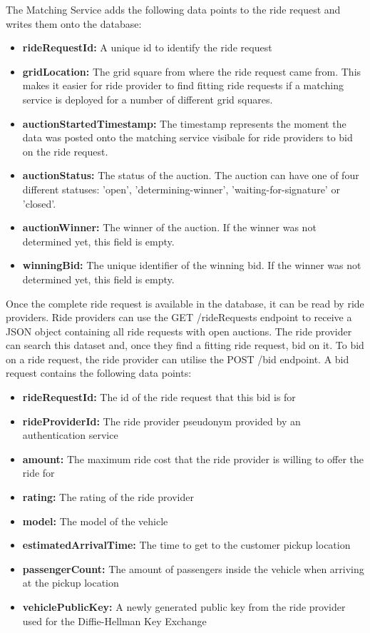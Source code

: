 The Matching Service adds the following data points to the ride request and writes them onto the database:

\begin{itemize}
    \item \textbf{rideRequestId:} A unique id to identify the ride request
    \item \textbf{gridLocation:} The grid square from where the ride request came from. This makes it easier for ride provider to find fitting ride requests if a matching service is deployed for a number of different grid squares. 
    \item \textbf{auctionStartedTimestamp:} The timestamp represents the moment the data was posted onto the matching service visibale for ride providers to bid on the ride request. 
    \item \textbf{auctionStatus:} The status of the auction. The auction can have one of four different statuses: 'open', 'determining-winner', 'waiting-for-signature' or 'closed'. 
    \item \textbf{auctionWinner:} The winner of the auction. If the winner was not determined yet, this field is empty.
    \item \textbf{winningBid:} The unique identifier of the winning bid. If the winner was not determined yet, this field is empty.
\end{itemize}

Once the complete ride request is available in the database, it can be read by ride providers. Ride providers can use the GET /rideRequests endpoint to receive a JSON object containing all ride requests with open auctions. The ride provider can search this dataset and, once they find a fitting ride request, bid on it.
To bid on a ride request, the ride provider can utilise the POST /bid endpoint. A bid request contains the following data points:

\begin{itemize}
    \item \textbf{rideRequestId:} The id of the ride request that this bid is for
    \item \textbf{rideProviderId:} The ride provider pseudonym provided by an authentication service
    \item \textbf{amount:} The maximum ride cost that the ride provider is willing to offer the ride for
    \item \textbf{rating:} The rating of the ride provider
    \item \textbf{model:} The model of the vehicle
    \item \textbf{estimatedArrivalTime:} The time to get to the customer pickup location
    \item \textbf{passengerCount:} The amount of passengers inside the vehicle when arriving at the pickup location
    \item \textbf{vehiclePublicKey:} A newly generated public key from the ride provider used for the Diffie-Hellman Key Exchange 
\end{itemize}

